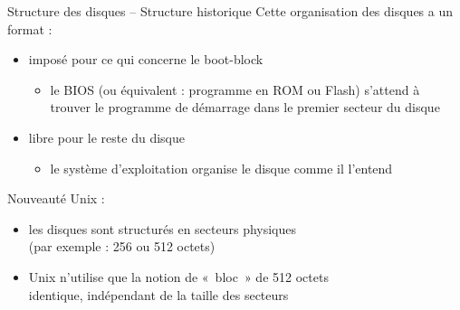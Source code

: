 \begin {frame} {Structure des disques -- Structure historique}
    Cette organisation des disques a un format :

    \begin {itemize}
	\item imposé pour ce qui concerne le boot-block

	    \begin {itemize}
		\item le BIOS (ou équivalent : programme en ROM ou Flash)
		    s'attend à trouver le programme de démarrage dans
		    le premier secteur du disque
	    \end {itemize}

	\item libre pour le reste du disque

	    \begin {itemize}
		\item le système d'exploitation organise le disque
		    comme il l'entend
	    \end {itemize}

    \end {itemize}

    \vspace* {2mm}

    Nouveauté Unix :

    \begin {itemize}
	\item les disques sont structurés en secteurs physiques
	    \\
	    (par exemple : 256 ou 512 octets)

	\item Unix n'utilise que la notion de «~bloc~» de 512 octets
	    \\
	    \implique identique, indépendant de la taille des secteurs
    \end {itemize}
\end {frame}

